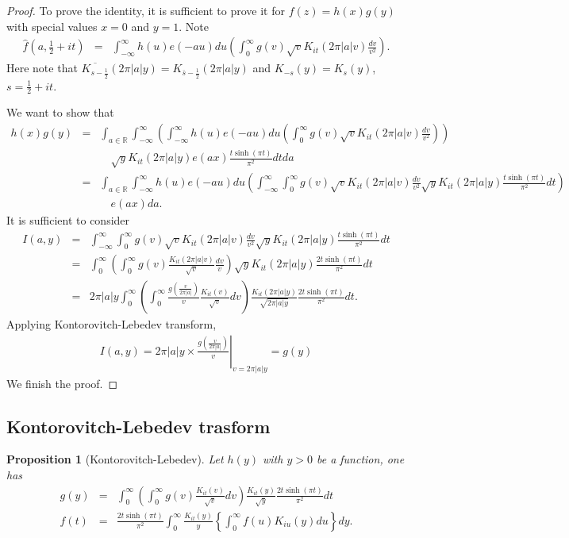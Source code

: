 \documentclass[11pt,reqno]{amsart}
\newcommand{\bna}{\begin{eqnarray*}}
\newcommand{\ena}{\end{eqnarray*}}
\def\R{\mathbb{R}}
\newtheorem{prop}[lemma]{Proposition}
\theoremstyle{definition}
\begin{document}
\begin{proof}
To prove the identity, it is sufficient to prove it for $f(z)=h(x)g(y)$
with special values $x=0$ and $y=1$. Note
\bna
\hat f(a,\frac{1}{2}+it)
&=&\int_{-\infty}^\infty h(u)e(-au)du
\left(
\int_0^\infty g(v)\sqrt{v}K_{it}(2\pi |a|v)\frac{dv}{v^2}
\right).
\ena
Here note that
$\overline{K_{s-\frac{1}{2}}}(2\pi |a|y)= K_{\overline s-\frac{1}{2}}(2\pi |a|y)$
and $K_{-s}(y)=K_{s}(y)$, $s=\frac{1}{2}+it$.

We want to show that
\bna
h(x)g(y)&=&
\int_{a\in\R}\int_{-\infty}^\infty
\left(\int_{-\infty}^\infty h(u)e(-au)du
\left(
\int_0^\infty g(v)\sqrt{v}K_{it}(2\pi |a|v)\frac{dv}{v^2}
\right)\right)\\
&&\quad\sqrt{y}K_{it}(2\pi |a|y)e(ax)
 \frac{t\sinh(\pi t)}{\pi^2}dtda\\
 &=&
\int_{a\in\R}
\int_{-\infty}^\infty h(u)e(-au)du
\left(\int_{-\infty}^\infty
\int_0^\infty g(v)\sqrt{v}K_{it}(2\pi |a|v)\frac{dv}{v^2}
\sqrt{y}K_{it}(2\pi |a|y) \frac{t\sinh(\pi t)}{\pi^2}dt
\right)\\
&&\quad e(ax)da.
 \ena
 It is sufficient to consider
\bna
I(a,y)&=&
\int_{-\infty}^\infty
\int_0^\infty g(v)\sqrt{v}K_{it}(2\pi |a|v)\frac{dv}{v^2}
\sqrt{y}K_{it}(2\pi |a|y) \frac{t\sinh(\pi t)}{\pi^2}dt\\
&=&\int_0^\infty
\left(\int_0^\infty g(v)\frac{K_{it}(2\pi|a|v)}{\sqrt{v}}
\frac{dv}{v}\right)
\sqrt{y}K_{it}(2\pi |a|y) \frac{2t\sinh(\pi t)}{\pi^2}dt\\
&=&
2\pi|a|y\int_0^\infty
\left(\int_0^\infty
\frac{g(\frac{v}{2\pi|a|})}
{v}\frac{K_{it}(v)}{\sqrt{v}}
dv\right)
\frac{K_{it}(2\pi |a|y)}{\sqrt{2\pi|a|y}} \frac{2t\sinh(\pi t)}{\pi^2}dt.
\ena
Applying Kontorovitch-Lebedev transform,
\bna
I(a,y)=2\pi |a|y \times \left.\frac{g\left(\frac{v}{2\pi |a|}\right)}{v}\right|_{v=2\pi|a|y}=g(y)
\ena
We finish the proof.
\end{proof}
\subsection{Kontorovitch-Lebedev trasform}
\begin{prop}[Kontorovitch-Lebedev]
Let $h(y)$ with $y>0$ be a function, one has
\bna
g(y)&=&\int_0^\infty
\left(\int_{0}^\infty g(v)\frac{K_{it}(v)}{\sqrt{v}}dv\right)
\frac{K_{it}(y)}{\sqrt{y}} \frac{2t\sinh(\pi t)}{\pi^2}dt\\
f(t)&=&\frac{2t\sinh(\pi t)}{\pi^2}
\int_0^\infty\frac{K_{it}(y)}{y}
\left\{
\int_0^\infty f(u)K_{iu}(y)du
\right\}dy.
\ena

\end{prop}
\end{document}
